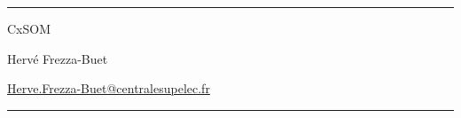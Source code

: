 \documentclass[a4paper,10pt]{article}
\begin{document}
\hrule
\vspace{5mm}
\centerline{\Huge \sc CxSOM}
\vspace{5mm}
\centerline{Hervé Frezza-Buet}
\centerline{\footnotesize\href{mailto:Herve.Frezza-Buet@centralesupelec.fr}{Herve.Frezza-Buet@centralesupelec.fr}}
\vspace{5mm}
\hrule
\vspace{10mm}
\tableofcontents






\end{document}
